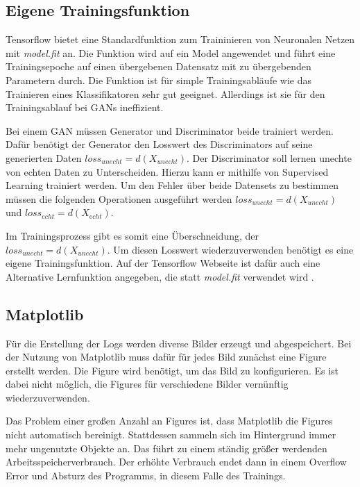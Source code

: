 \subsection{Eigene Trainingsfunktion}
Tensorflow bietet eine Standardfunktion zum Traininieren von Neuronalen Netzen mit \textit{model.fit} an.
Die Funktion wird auf ein Model angewendet und führt eine Trainingsepoche auf einen übergebenen Datensatz mit zu übergebenden Parametern durch.
Die Funktion ist für simple Trainingsabläufe wie das Trainieren eines Klassifikatoren sehr gut geeignet.
Allerdings ist sie für den Trainingsablauf bei GANs ineffizient.
\newline

Bei einem GAN müssen Generator und Discriminator beide trainiert werden.
Dafür benötigt der Generator den Losswert des Discriminators auf seine generierten Daten $loss_{unecht} = d(X_{unecht})$.
Der Discriminator soll lernen unechte von echten Daten zu Unterscheiden.
Hierzu kann er mithilfe von Supervised Learning trainiert werden.
Um den Fehler über beide Datensets zu bestimmen müssen die folgenden Operationen ausgeführt werden $loss_{unecht} = d(X_{unecht})$ und $loss_{echt} = d(X_{echt})$.
\newline

Im Trainingsprozess gibt es somit eine Überschneidung, der $loss_{unecht} = d(X_{unecht})$.
Um diesen Losswert wiederzuverwenden benötigt es eine eigene Trainingsfunktion.
Auf der Tensorflow Webseite ist dafür auch eine Alternative Lernfunktion angegeben, die statt \textit{model.fit} verwendet wird \cite{tensorflow-gan-learn-step}.

\subsection{Matplotlib}
Für die Erstellung der Logs werden diverse Bilder erzeugt und abgespeichert.
Bei der Nutzung von Matplotlib muss dafür für jedes Bild zunächst eine Figure erstellt werden.
Die Figure wird benötigt, um das Bild zu konfigurieren.
Es ist dabei nicht möglich, die Figures für verschiedene Bilder vernünftig wiederzuverwenden.
\newline

Das Problem einer großen Anzahl an Figures ist, dass Matplotlib die Figures nicht automatisch bereinigt.
Stattdessen sammeln sich im Hintergrund immer mehr ungenutzte Objekte an.
Das führt zu einem ständig größer werdenden Arbeitsspeicherverbrauch.
Der erhöhte Verbrauch endet dann in einem Overflow Error und Absturz des Programms, in diesem Falle des Trainings.
\newline

